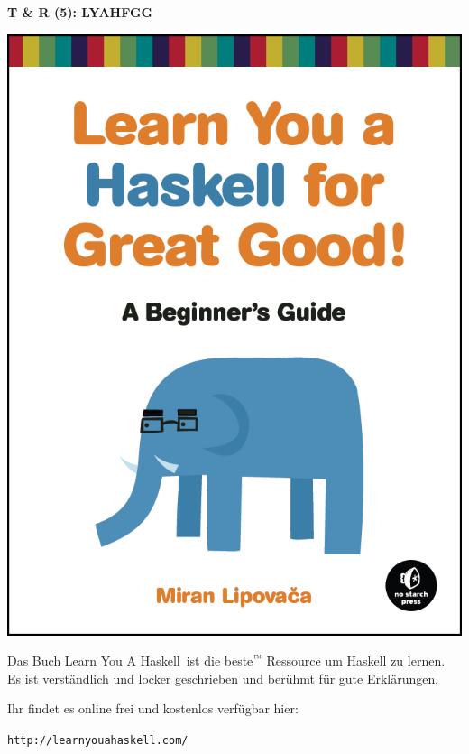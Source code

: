 \documentclass{beamer}
\begin{document}
  \begin{frame}
    \begin{center}
    \Large\textbf{T \& R (5): LYAHFGG}\\ \bigskip \normalsize
    \begin{multicols}{2}
    
	\includegraphics[scale=0.15]{lyah.png} 
	
	\columnbreak    
    Das Buch \glqq Learn You A Haskell\grqq\ ist die beste$^{™}$ Ressource um Haskell zu lernen. Es ist verständlich und locker geschrieben und berühmt für gute Erklärungen.\bigskip
   
    Ihr findet es online frei und kostenlos verfügbar hier:
    
    \texttt{http://learnyouahaskell.com/}
    \end{multicols}
    \end{center}
  \end{frame}
  
  
\end{document}
